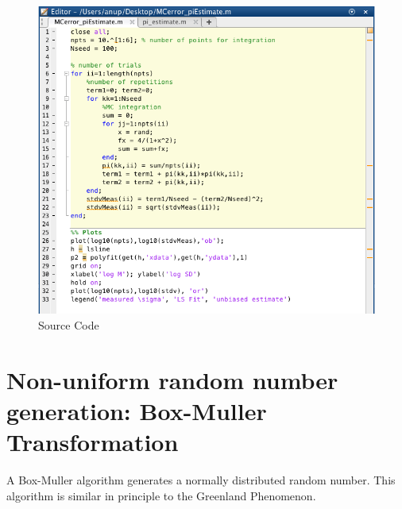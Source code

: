\documentclass[12pt, oneside]{article}   	%
\begin{document}
		\begin{figure} [!htbp]
	\centering
	 \includegraphics[scale=0.5]{stdv_fitCode.jpg}
	\caption{Source Code}
	\end{figure}
\pagebreak
\section{Non-uniform random number generation: Box-Muller Transformation}
A Box-Muller algorithm generates a normally distributed random number. This algorithm is similar in principle to the Greenland Phenomenon.
\end{document}
